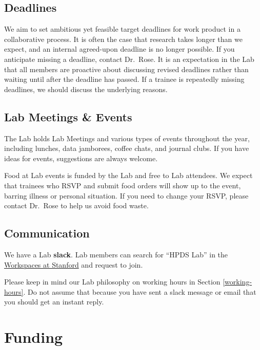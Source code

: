 \documentclass[
]{book}
\begin{document}
\hypertarget{deadlines}{%
\section{Deadlines}\label{deadlines}}

We aim to set ambitious yet feasible target deadlines for work product in a collaborative process. It is often the case that research takes longer than we expect, and an internal agreed-upon deadline is no longer possible. If you anticipate missing a deadline, contact Dr.~Rose. It is an expectation in the Lab that all members are proactive about discussing revised deadlines rather than waiting until after the deadline has passed. If a trainee is repeatedly missing deadlines, we should discuss the underlying reasons.

\hypertarget{lab-meetings-events}{%
\section{Lab Meetings \& Events}\label{lab-meetings-events}}

The Lab holds Lab Meetings and various types of events throughout the year, including lunches, data jamborees, coffee chats, and journal clubs. If you have ideas for events, suggestions are always welcome.

Food at Lab events is funded by the Lab and free to Lab attendees. We expect that trainees who RSVP and submit food orders will show up to the event, barring illness or personal situation. If you need to change your RSVP, please contact Dr.~Rose to help us avoid food waste.

\hypertarget{communication}{%
\section{Communication}\label{communication}}

We have a Lab \textbf{slack}. Lab members can search for ``HPDS Lab'' in the \href{https://stanford.enterprise.slack.com/}{Workspaces at Stanford} and request to join.

Please keep in mind our Lab philosophy on working hours in Section \ref{working-hours}. Do not assume that because you have sent a slack message or email that you should get an instant reply.

\hypertarget{funding}{%
\chapter{Funding}\label{funding}}
\end{document}
